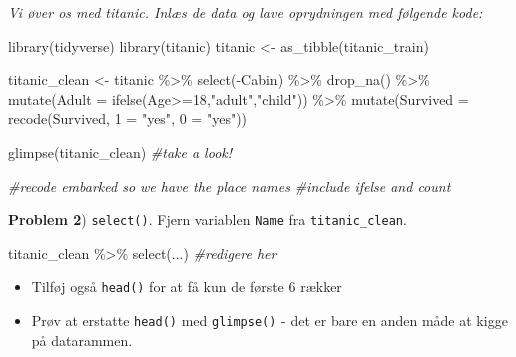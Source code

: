 \documentclass[
]{book}
\newenvironment{Shaded}{\begin{snugshade}}{\end{snugshade}}
\newcommand{\AttributeTok}[1]{\textcolor[rgb]{0.77,0.63,0.00}{#1}}
\newcommand{\CommentTok}[1]{\textcolor[rgb]{0.56,0.35,0.01}{\textit{#1}}}
\newcommand{\DecValTok}[1]{\textcolor[rgb]{0.00,0.00,0.81}{#1}}
\newcommand{\FunctionTok}[1]{\textcolor[rgb]{0.00,0.00,0.00}{#1}}
\newcommand{\NormalTok}[1]{#1}
\newcommand{\OtherTok}[1]{\textcolor[rgb]{0.56,0.35,0.01}{#1}}
\newcommand{\SpecialCharTok}[1]{\textcolor[rgb]{0.00,0.00,0.00}{#1}}
\newcommand{\StringTok}[1]{\textcolor[rgb]{0.31,0.60,0.02}{#1}}
\providecommand{\tightlist}{%
  \setlength{\itemsep}{0pt}\setlength{\parskip}{0pt}}
\begin{document}
\emph{Vi øver os med titanic. Inlæs de data og lave oprydningen med følgende kode:}

\begin{Shaded}
\begin{Highlighting}[]
\FunctionTok{library}\NormalTok{(tidyverse)}
\FunctionTok{library}\NormalTok{(titanic)}
\NormalTok{titanic }\OtherTok{\textless{}{-}} \FunctionTok{as\_tibble}\NormalTok{(titanic\_train)}

\NormalTok{titanic\_clean }\OtherTok{\textless{}{-}}\NormalTok{ titanic }\SpecialCharTok{\%\textgreater{}\%} 
    \FunctionTok{select}\NormalTok{(}\SpecialCharTok{{-}}\NormalTok{Cabin) }\SpecialCharTok{\%\textgreater{}\%} 
    \FunctionTok{drop\_na}\NormalTok{() }\SpecialCharTok{\%\textgreater{}\%} 
    \FunctionTok{mutate}\NormalTok{(}\AttributeTok{Adult =} \FunctionTok{ifelse}\NormalTok{(Age}\SpecialCharTok{\textgreater{}=}\DecValTok{18}\NormalTok{,}\StringTok{"adult"}\NormalTok{,}\StringTok{"child"}\NormalTok{)) }\SpecialCharTok{\%\textgreater{}\%}
    \FunctionTok{mutate}\NormalTok{(}\AttributeTok{Survived =} \FunctionTok{recode}\NormalTok{(Survived,  }\StringTok{\textasciigrave{}}\AttributeTok{1}\StringTok{\textasciigrave{}} \OtherTok{=} \StringTok{"yes"}\NormalTok{, }\StringTok{\textasciigrave{}}\AttributeTok{0}\StringTok{\textasciigrave{}} \OtherTok{=} \StringTok{"yes"}\NormalTok{)) }
    
\FunctionTok{glimpse}\NormalTok{(titanic\_clean) }\CommentTok{\#take a look!}

\CommentTok{\#recode embarked so we have the place names}
\CommentTok{\#include ifelse and count}
\end{Highlighting}
\end{Shaded}

\textbf{Problem 2}) \texttt{select()}. Fjern variablen \texttt{Name} fra \texttt{titanic\_clean}.

\begin{Shaded}
\begin{Highlighting}[]
\NormalTok{titanic\_clean }\SpecialCharTok{\%\textgreater{}\%} 
    \FunctionTok{select}\NormalTok{(...) }\CommentTok{\#redigere her}
\end{Highlighting}
\end{Shaded}

\begin{itemize}
\tightlist
\item
  Tilføj også \texttt{head()} for at få kun de første 6 rækker
\item
  Prøv at erstatte \texttt{head()} med \texttt{glimpse()} - det er bare en anden måde at kigge på datarammen.
\end{itemize}
\end{document}
